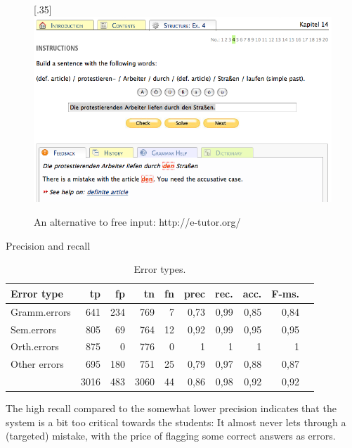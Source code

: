 \documentclass[11pt]{article}
\begin{document}
\begin{figure}[htbp]
\begin{center}
\scalebox{.35}[.35]{\includegraphics{presentation/img/e-tutor.png}}\\
\caption{An alternative to free input: http://e-tutor.org/}
\end{center}
\end{figure}
 
Precision and recall
\begin{table}[htbp]
\begin{tabular}{|l|r|r|r|r||r|r|r|r|r|}
\hline
Error type	& tp		& fp		& tn		& fn	& prec	 & rec.	& acc.	& F-ms. \\
\hline
Gramm.errors    &   641   &   234   &   769    &   7    &   0,73   &   0,99   &   0,85   &   0,84	  \\
Sem.errors       &   805   &   69    &   764    &   12   &   0,92   &   0,99   &   0,95   &   0,95		  \\
Orth.errors      &   875   &   0     &   776    &   0    &   1      &   1      &   1      &   1					  \\
Other errors     &   695   &   180   &   751    &   25   &   0,79   &   0,97   &   0,88   &   0,87	  \\
\hline
  &   3016  &   483   &   3060   &   44   &   0,86   &   0,98   &   0,92   &   0,92			  \\
\hline
\end{tabular}
\caption{Error types.}
\label{errortypes}
\end{table}%

The high recall compared to the somewhat lower precision indicates that the system is a bit too critical towards the students:
It almost never lets through a (targeted) mistake, with the price of flagging some correct answers as errors.
 
\end{document}
